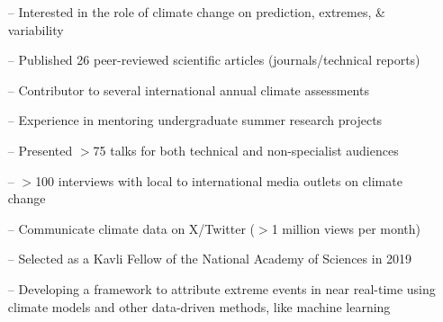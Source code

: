 \documentclass[10pt,a4paper]{altacv}
\begin{document}

%

\begin{fullwidth}
\makecvheader
\end{fullwidth}

%

\vspace{-0.09in}
\begin{itemize}
    \setlength{\itemindent}{0.5em}
    \item[--] \small{Interested in the role of climate change on prediction, extremes, \& variability}
    \item[--] \small{Published 26 peer-reviewed scientific articles (journals/technical reports)}
    \item[--] \small{Contributor to several international annual climate assessments}
    \item[--] \small{Experience in mentoring undergraduate summer research projects}
    \item[--] \small{Presented $>$75 talks for both technical and non-specialist audiences}
    \item[--] \small{$>$100 interviews with local to international media outlets on climate change}
    \item[--] \small{Communicate climate data on X/Twitter ($>$1 million views per month)}
    \item[--] \small{Selected as a Kavli Fellow of the National Academy of Sciences in 2019}
\end{itemize}
\medskip



\begin{itemize}
    \setlength{\itemindent}{0.5em}
    \item[--]   \small{Developing a framework to attribute extreme events in near real-time using climate models and other data-driven methods, like machine learning}
\end{itemize}
\medskip
\end{document}
